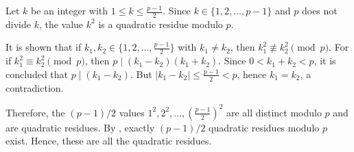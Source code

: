 \begin{enumerate}
  \begin{subprove}
    Let $k$ be an integer with $1\leq k\leq \frac{p-1}{2}$. Since $k\in\{1,2,\ldots,p-1\}$ and $p$ does not divide $k$, the value $k^2$ is a quadratic residue modulo $p$.
    
    It is shown that if $k_1,k_2\in\{1,2,\ldots,\frac{p-1}{2}\}$ with $k_1\neq k_2$, then $k_1^2\not\equiv k_2^2\pmod{p}$. For if $k_1^2\equiv k_2^2\pmod{p}$, then $p\mid(k_1-k_2)(k_1+k_2)$. Since $0<k_1+k_2<p$, it is concluded that $p\mid(k_1-k_2)$. But $|k_1-k_2|\leq\frac{p-1}{2}<p$, hence $k_1=k_2$, a contradiction.
    
    Therefore, the $(p-1)/2$ values $1^2,2^2,\ldots,\left(\frac{p-1}{2}\right)^2$ are all distinct modulo $p$ and are quadratic residues. By , exactly $(p-1)/2$ quadratic residues modulo $p$ exist. Hence, these are all the quadratic residues.
  \end{subprove}



\end{enumerate}
